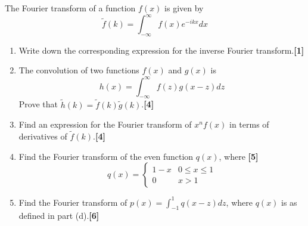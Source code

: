 \documentclass[a4paper]{article}
\begin{document}
\begin{qns}
The Fourier transform of a function $f(x)$ is given by
$$\tilde{f}(k)=\int_{-\infty}^\infty f(x)e^{-ikx}dx$$
\begin{enumerate}[label=(\alph*)]
\item Write down the corresponding expression for the inverse Fourier transform.\hfill\textbf{[1]}
\item The convolution of two functions $f(x)$ and $g(x)$ is
$$h(x)=\int_{-\infty}^\infty f(z)g(x-z)dz$$
Prove that $\tilde{h}(k) = \tilde{f}(k)\tilde{g}(k)$.\hfill\textbf{[4]}
\item Find an expression for the Fourier transform of $x^nf(x)$ in terms of derivatives of $\tilde{f}(k)$.\hfill\textbf{[4]}
\item Find the Fourier transform of the even function $q(x)$, where \hfill\textbf{[5]}
$$q(x)=
\left\{
        \begin{array}{ll}
      1-x & 0\leq x\leq 1 \\
      0 & x>1
        \end{array}
    \right.$$
\item Find the Fourier transform of $p(x)=\int_{-1}^1q(x-z)dz$, where $q(x)$ is as defined in part (d).\hfill\textbf{[6]}
\end{enumerate}
\end{qns}
\end{document}
